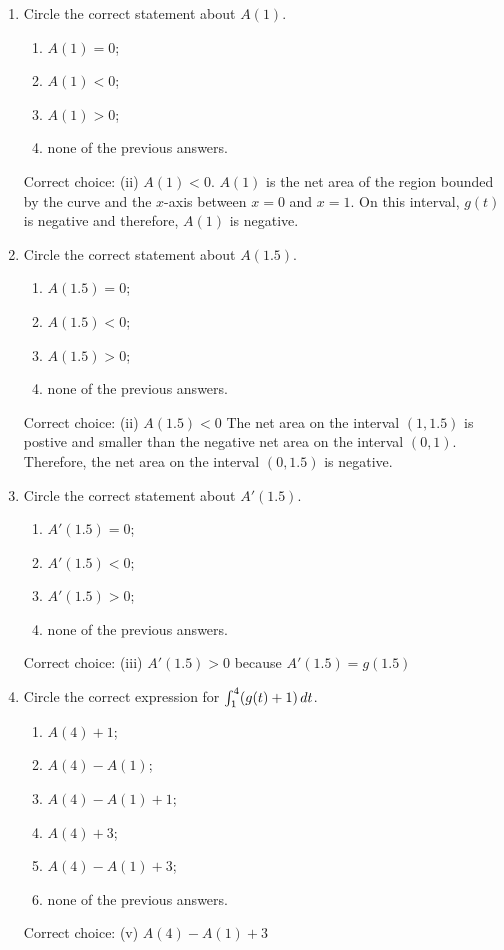 \documentclass{ximera}
\begin{document}
\begin{problem}
\begin{enumerate}
    \item
      Circle the correct statement about $A(1)$.
      \begin{enumerate}
        \item $A(1) = 0$;
        \item $A(1) < 0$;
        \item $A(1) > 0$;
        \item none of the previous answers.
      \end{enumerate}
      \begin{explanation}
        Correct choice: (ii) $A(1) < 0$.  $A(1)$ is the net area of the region bounded by the curve and the $x$-axis between $x=0$ and $x=1$.  On this interval, $g(t)$ is negative and therefore, $ A(1)$ is negative.
      \end{explanation}
    \item
      Circle the correct statement about $A(1.5)$.
      \begin{enumerate}
        \item $A(1.5) = 0$;
        \item $A(1.5) < 0$;
        \item $A(1.5) > 0$;
        \item  none of the previous answers.
      \end{enumerate}
      \begin{explanation}
        Correct choice: (ii) $A(1.5) < 0$  The net area on the interval $(1,1.5)$ is postive and smaller than the negative net area on the interval $(0,1)$.  Therefore, the net area on the interval $(0,1.5)$ is negative.
      \end{explanation}
    \item
      Circle the correct statement about $A'(1.5)$.
      \begin{enumerate}
        \item $A'(1.5) = 0$;
        \item $A'(1.5) < 0$;
        \item $A'(1.5) > 0$;
        \item none of the previous answers.
      \end{enumerate}
      \begin{explanation}
        Correct choice: (iii) $A'(1.5) > 0$  because $A'(1.5)=g(1.5)$
      \end{explanation}
    \item
      Circle the correct expression for $\int_1^4 (g(t) + 1) \,d t$.
      \begin{enumerate}
        \item $A(4) + 1$;
        \item $A(4) - A(1)$;
        \item $A(4) - A(1) + 1$;
        \item $A(4) + 3$;
        \item $A(4) - A(1) + 3$;
        \item none of the previous answers.
      \end{enumerate}
      \begin{explanation}
        Correct choice: (v) $A(4) - A(1) + 3$
        

\end{explanation}
\end{enumerate}
\end{problem}
\end{document}
